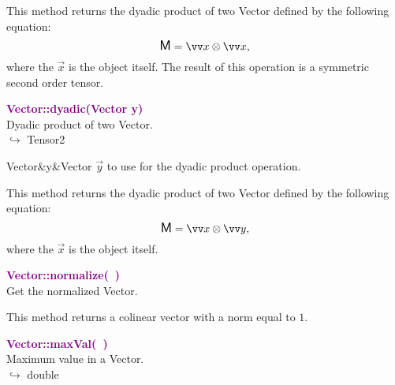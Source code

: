 This method returns the dyadic product of two Vector defined by the following equation:
\begin{equation*}
\M = \overrightarrow{x}\otimes\overrightarrow{x},
\end{equation*}
where the $\overrightarrow{x}$ is the object itself. The result of this operation is a symmetric second order tensor.

\textcolor{purple}{\textbf{Vector::dyadic(Vector y)}}\label{Vector::dyadic(Vector y)}\\
Dyadic product of two Vector.\\ \hspace*{10mm}$\hookrightarrow$ Tensor2

\begin{tcolorbox}[width=\textwidth,myArgs,tabularx={ll|R}]
Vector&y&Vector $\overrightarrow{y}$ to use for the dyadic product operation.
\end{tcolorbox}

This method returns the dyadic product of two Vector defined by the following equation:
\begin{equation*}
\M = \overrightarrow{x}\otimes\overrightarrow{y},
\end{equation*}
where the $\overrightarrow{x}$ is the object itself.

\textcolor{purple}{\textbf{Vector::normalize(~)}}\label{Vector::normalize()}\\
Get the normalized Vector.

This method returns a colinear vector with a norm equal to $1$.

\textcolor{purple}{\textbf{Vector::maxVal(~)}}\label{Vector::maxVal()}\\
Maximum value in a Vector.\\ \hspace*{10mm}$\hookrightarrow$ double

